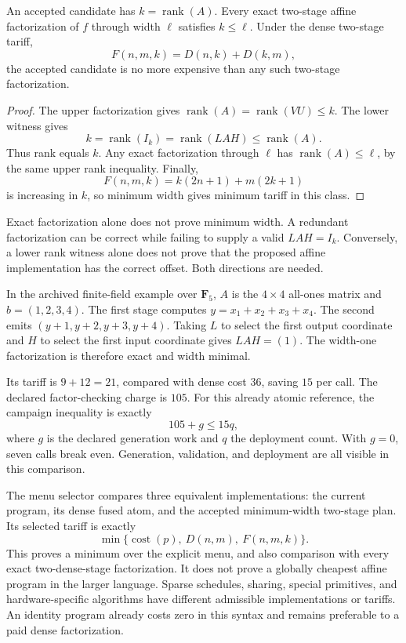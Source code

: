 \begin{theorem}
\label{thm:affine-width}
An accepted candidate has $k=\operatorname{rank}(A)$. Every exact two-stage affine factorization of $f$ through width $\ell$ satisfies $k\le\ell$. Under the dense two-stage tariff,
\[
 F(n,m,k)=D(n,k)+D(k,m),
\]
the accepted candidate is no more expensive than any such two-stage factorization.
\end{theorem}
\begin{proof}
The upper factorization gives $\operatorname{rank}(A)=\operatorname{rank}(VU)\le k$. The lower witness gives
\[
 k=\operatorname{rank}(I_k)=\operatorname{rank}(LAH)\le\operatorname{rank}(A).
\]
Thus rank equals $k$. Any exact factorization through $\ell$ has $\operatorname{rank}(A)\le\ell$, by the same upper rank inequality. Finally,
\[
 F(n,m,k)=k(2n+1)+m(2k+1)
\]
is increasing in $k$, so minimum width gives minimum tariff in this class.
\end{proof}

Exact factorization alone does not prove minimum width. A redundant factorization can be correct while failing to supply a valid $LAH=I_k$. Conversely, a lower rank witness alone does not prove that the proposed affine implementation has the correct offset. Both directions are needed.

\begin{example}
In the archived finite-field example over $\mathbf F_5$, $A$ is the $4\times4$ all-ones matrix and $b=(1,2,3,4)$. The first stage computes $y=x_1+x_2+x_3+x_4$. The second emits $(y+1,y+2,y+3,y+4)$. Taking $L$ to select the first output coordinate and $H$ to select the first input coordinate gives $LAH=(1)$. The width-one factorization is therefore exact and width minimal.

Its tariff is $9+12=21$, compared with dense cost $36$, saving $15$ per call. The declared factor-checking charge is $105$. For this already atomic reference, the campaign inequality is exactly
\[
 105+g\le15q,
\]
where $g$ is the declared generation work and $q$ the deployment count. With $g=0$, seven calls break even. Generation, validation, and deployment are all visible in this comparison.
\end{example}

The menu selector compares three equivalent implementations: the current program, its dense fused atom, and the accepted minimum-width two-stage plan. Its selected tariff is exactly
\[
 \min\{\operatorname{cost}(p),\ D(n,m),\ F(n,m,k)\}.
\]
This proves a minimum over the explicit menu, and also comparison with every exact two-dense-stage factorization. It does not prove a globally cheapest affine program in the larger language. Sparse schedules, sharing, special primitives, and hardware-specific algorithms have different admissible implementations or tariffs. An identity program already costs zero in this syntax and remains preferable to a paid dense factorization.

